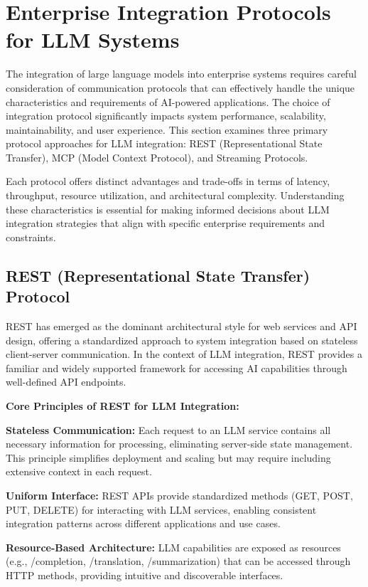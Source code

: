 \section{Enterprise Integration Protocols for LLM Systems}

The integration of large language models into enterprise systems requires careful consideration of communication protocols that can effectively handle the unique characteristics and requirements of AI-powered applications. The choice of integration protocol significantly impacts system performance, scalability, maintainability, and user experience. This section examines three primary protocol approaches for LLM integration: REST (Representational State Transfer), MCP (Model Context Protocol), and Streaming Protocols.

Each protocol offers distinct advantages and trade-offs in terms of latency, throughput, resource utilization, and architectural complexity. Understanding these characteristics is essential for making informed decisions about LLM integration strategies that align with specific enterprise requirements and constraints.

\subsection{REST (Representational State Transfer) Protocol}

REST has emerged as the dominant architectural style for web services and API design, offering a standardized approach to system integration based on stateless client-server communication. In the context of LLM integration, REST provides a familiar and widely supported framework for accessing AI capabilities through well-defined API endpoints.

\textbf{Core Principles of REST for LLM Integration:}

\textbf{Stateless Communication:} Each request to an LLM service contains all necessary information for processing, eliminating server-side state management. This principle simplifies deployment and scaling but may require including extensive context in each request.

\textbf{Uniform Interface:} REST APIs provide standardized methods (GET, POST, PUT, DELETE) for interacting with LLM services, enabling consistent integration patterns across different applications and use cases.

\textbf{Resource-Based Architecture:} LLM capabilities are exposed as resources (e.g., /completion, /translation, /summarization) that can be accessed through HTTP methods, providing intuitive and discoverable interfaces.

